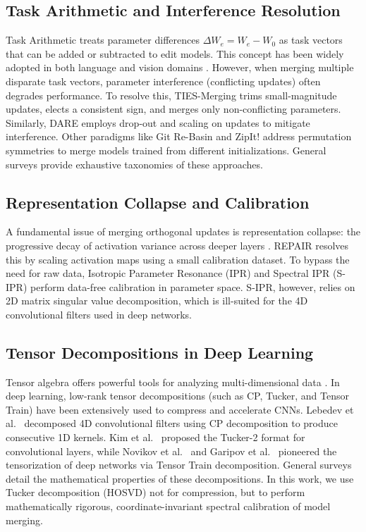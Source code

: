 \documentclass{article}
\theoremstyle{plain}
\theoremstyle{definition}
\theoremstyle{remark}
\begin{document}
\subsection{Task Arithmetic and Interference Resolution}
Task Arithmetic \cite{ilharco2022editing} treats parameter differences $\Delta W_e = W_e - W_0$ as task vectors that can be added or subtracted to edit models. This concept has been widely adopted in both language \cite{yu2023language} and vision domains \cite{ramesh2021zero}. However, when merging multiple disparate task vectors, parameter interference (conflicting updates) often degrades performance. To resolve this, TIES-Merging \cite{yadav2023ties} trims small-magnitude updates, elects a consistent sign, and merges only non-conflicting parameters. Similarly, DARE \cite{yu2023dare} employs drop-out and scaling on updates to mitigate interference. Other paradigms like Git Re-Basin \cite{ainsworth2023git} and ZipIt! \cite{stoica2023zipit} address permutation symmetries to merge models trained from different initializations. General surveys \cite{mucke2023merging, zhang2024survey, song2026model} provide exhaustive taxonomies of these approaches.

\subsection{Representation Collapse and Calibration}
A fundamental issue of merging orthogonal updates is representation collapse: the progressive decay of activation variance across deeper layers \cite{jordan2023repair}. REPAIR \cite{jordan2023repair} resolves this by scaling activation maps using a small calibration dataset. To bypass the need for raw data, Isotropic Parameter Resonance (IPR) and Spectral IPR (S-IPR) \cite{wortsman2022model, mucke2023merging} perform data-free calibration in parameter space. S-IPR, however, relies on 2D matrix singular value decomposition, which is ill-suited for the 4D convolutional filters used in deep networks.

\subsection{Tensor Decompositions in Deep Learning}
Tensor algebra offers powerful tools for analyzing multi-dimensional data \cite{kolda2009tensor}. In deep learning, low-rank tensor decompositions (such as CP, Tucker, and Tensor Train) have been extensively used to compress and accelerate CNNs. Lebedev et al.\ \cite{lebedev2015speeding} decomposed 4D convolutional filters using CP decomposition to produce consecutive 1D kernels. Kim et al.\ \cite{kim2016compression} proposed the Tucker-2 format for convolutional layers, while Novikov et al.\ \cite{novikov2015tensorizing} and Garipov et al.\ \cite{garipov2017ultimate} pioneered the tensorization of deep networks via Tensor Train decomposition. General surveys \cite{ji2019survey, cichocki2017tensor} detail the mathematical properties of these decompositions. In this work, we use Tucker decomposition (HOSVD) not for compression, but to perform mathematically rigorous, coordinate-invariant spectral calibration of model merging.
\end{document}
